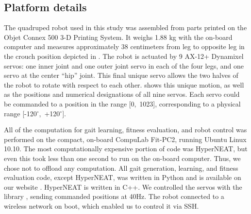 \subsection{Platform details}






The quadruped robot used in this study was assembled from parts
printed on the Objet Connex 500 3-D Printing System. It weighs 1.88 kg
with the on-board computer and measures approximately 38 centimeters
from leg to opposite leg in the crouch position depicted in
. The robot is actuated by 9 AX-12+
Dynamixel servos: one inner joint and one outer joint servo in each of
the four legs, and one servo at the center ``hip'' joint.  This final
unique servo allows the two halves of the robot to rotate with respect
to each other.  shows this unique motion, as well
as the positions and numerical designations of all nine servos.  Each
servo could be commanded to a position in the range [0,~1023],
corresponding to a physical range [-120$^{\circ}$,~+120$^{\circ}$].

All of the computation for gait learning, fitness evaluation, and
robot control was performed on the compact, on-board CompuLab Fit-PC2,
running Ubuntu Linux 10.10. 
The most computationally expensive portion of code was HyperNEAT, but even
this took less than one second to run on the on-board computer. Thus,
we chose not to offload any computation.
All gait generation, learning, and fitness
evaluation code, except HyperNEAT, was written in Python and is
available on our website \cite{quadratotWeb}.  HyperNEAT is written in
C++.  We controlled the servos with the  library
\cite{pydynamixel}, sending commanded positions at 40Hz.  The robot
connected to a wireless network on boot, which enabled us to control
it via SSH.


